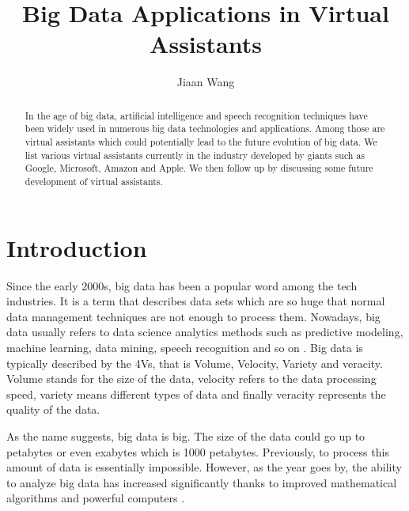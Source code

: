 \title{Big Data Applications in Virtual Assistants}

\author{Jiaan Wang}

\begin{abstract}

    In the age of big data, artificial intelligence and speech recognition 
    techniques have been widely used in numerous big data technologies and 
    applications. Among those are virtual assistants which could potentially 
    lead to the future evolution of big data. We list various virtual assistants 
    currently in the industry developed by giants such as Google, Microsoft, 
    Amazon and Apple. We then follow up by discussing some future development 
    of virtual assistants.
    
\end{abstract}


\maketitle

\section{Introduction}

Since the early 2000s, big data has been a popular word among the tech industries. It is a term that describes data sets which are so huge that normal data management techniques are not enough to process them. Nowadays, big data usually refers to data science analytics methods such as predictive modeling, machine learning, data mining, speech recognition and so on \cite{Tal2015internet}. Big data is typically described by the 4Vs, that is Volume, Velocity, Variety and veracity. Volume stands for the size of the data, velocity refers to the data processing speed, variety means different types of data and finally veracity represents the quality of the data. 

As the name suggests, big data is big. The size of the data could go up to petabytes or even exabytes which is 1000 petabytes. Previously, to process this amount of data is essentially impossible. However, as the year goes by, the ability to analyze big data has increased significantly thanks to improved mathematical algorithms and powerful computers \cite{Tal2015internet}. 

